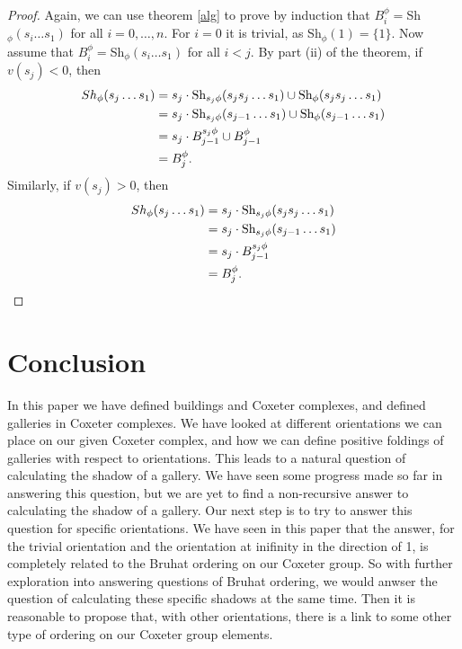 \documentclass[11pt]{article}
\begin{document}
\begin{proof}
    Again, we can use theorem \ref{alg} to prove by induction that $B^\phi_i=$Sh$_\phi(s_i\hdots s_1)$ for all $i=0,\hdots ,n$. For $i=0$ it is trivial, as Sh$_\phi(1)=\{1\}$. Now assume that $B^\phi_i=$Sh$_\phi(s_i\hdots s_1)$ for all $i<j$. By part (ii) of the theorem, if $v(s_j)<0$, then
    \[\begin{aligned}
        Sh_\phi(s_j\hdots s_1)&=s_j\cdot \textnormal{Sh}_{s_j\phi}(s_js_j\hdots s_1)\cup \textnormal{Sh}_\phi(s_js_j\hdots s_1)\\
                        &=  s_j\cdot \textnormal{Sh}_{s_j\phi}(s_{j-1}\hdots s_1)\cup \textnormal{Sh}_\phi(s_{j-1}\hdots s_1)\\
                        &= s_j\cdot B^{s_j\phi}_{j-1}\cup B^{\phi}_{j-1}\\
                        &= B^\phi_j. 
    \end{aligned}\]
    Similarly, if $v(s_j)>0$, then
    \[\begin{aligned}
        Sh_\phi(s_j\hdots s_1)& = s_j\cdot \textnormal{Sh}_{s_j\phi}(s_js_j\hdots s_1)\\
                        & = s_j\cdot \textnormal{Sh}_{s_j\phi}(s_{j-1}\hdots s_1)\\
                        & = s_j \cdot B^{s_j\phi}_{j-1}\\
                        & = B^{\phi}_{j}. 
    \end{aligned}\]
\end{proof}


\section{Conclusion}

In this paper we have defined buildings and Coxeter complexes, and defined galleries in Coxeter complexes. We have looked at different orientations we can place on our given Coxeter complex, and how we can define positive foldings of galleries with respect to orientations. This leads to a natural question of calculating the shadow of a gallery. We have seen some progress made so far in answering this question, but we are yet to find a non-recursive answer to calculating the shadow of a gallery. Our next step is to try to answer this question for specific orientations. We have seen in this paper that the answer, for the trivial orientation and the orientation at inifinity in the direction of 1, is completely related to the Bruhat ordering on our Coxeter group. So with further exploration into answering questions of Bruhat ordering, we would anwser the question of calculating these specific shadows at the same time. Then it is reasonable to propose that, with other orientations, there is a link to some other type of ordering on our Coxeter group elements. 



\end{document}
